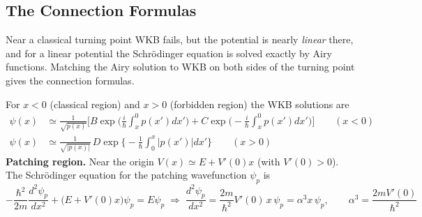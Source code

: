 \documentclass[11pt,a4paper]{article}
\begin{document}
\subsection{The Connection Formulas}\label{ap:sec:conn}
Near a classical turning point WKB fails, but the potential is nearly \textit{linear} there, and for a linear potential the Schr\"odinger equation is solved exactly by Airy functions. Matching the Airy solution to WKB on both sides of the turning point gives the connection formulas.

\begin{center}
\end{center}
For $x<0$ (classical region) and $x>0$ (forbidden region) the WKB solutions are
\begin{align}
\psi(x)&\simeq\frac1{\sqrt{p(x)}}\Big[B\exp\Big(\frac i\hbar\int_x^0p(x')dx'\Big) + C\exp\Big(-\frac i\hbar\int_x^0p(x')dx'\Big)\Big]\qquad(x<0)\tag{A}\\
\psi(x)&\simeq\frac1{\sqrt{|p(x)|}}\,D\exp\Big\{-\frac1\hbar\int_0^x|p(x')|dx'\Big\}\qquad(x>0)\tag{B}
\end{align}
\textbf{Patching region.} Near the origin $V(x)\simeq E+V'(0)x$ (with $V'(0)>0$). The Schr\"odinger equation for the patching wavefunction $\psi_p$ is
\[
-\frac{\hbar^2}{2m}\frac{d^2\psi_p}{dx^2} + \big(E+V'(0)x\big)\psi_p = E\psi_p \;\Rightarrow\; \frac{d^2\psi_p}{dx^2} = \frac{2m}{\hbar^2}V'(0)\,x\,\psi_p = \alpha^3x\,\psi_p,\qquad \alpha^3 = \frac{2mV'(0)}{\hbar^2}
\]
\end{document}
